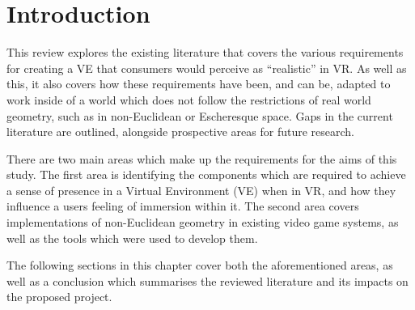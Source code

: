\section{Introduction}
\label{lr:intro}

	This review explores the existing literature that covers the various requirements for creating a VE that consumers would perceive as \enquote{realistic} in VR.
	As well as this, it also covers how these requirements have been, and can be, adapted to work inside of a world which does not follow the restrictions of real world geometry, such as in non-Euclidean or Escheresque space.
	Gaps in the current literature are outlined, alongside prospective areas for future research.

	There are two main areas which make up the requirements for the aims of this study.
	The first area is identifying the components which are required to achieve a sense of presence in a Virtual Environment (VE) when in VR, and how they influence a users feeling of immersion within it.
	The second area covers implementations of non-Euclidean geometry in existing video game systems, as well as the tools which were used to develop them. %

	The following sections in this chapter cover both the aforementioned areas, as well as a conclusion which summarises the reviewed literature and its impacts on the proposed project.
